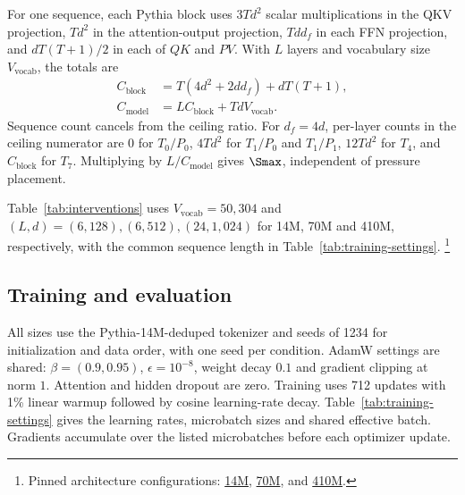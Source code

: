For one sequence, each Pythia block uses $3Td^2$ scalar multiplications
in the QKV projection, $Td^2$ in the attention-output projection,
$Td d_f$ in each FFN projection, and $dT(T+1)/2$ in each of $QK$ and $PV$.
With $L$ layers and vocabulary size $V_{\mathrm{vocab}}$, the totals are
\begin{equation}
\begin{split}
C_{\mathrm{block}}&=T(4d^2+2dd_f)+dT(T+1),\\
C_{\mathrm{model}}&=LC_{\mathrm{block}}+TdV_{\mathrm{vocab}}.
\end{split}
\label{eq:denominator}
\end{equation}
Sequence count cancels from the ceiling ratio. For $d_f=4d$, per-layer counts
in the ceiling numerator are $0$ for $T_0/P_0$, $4Td^2$ for $T_1/P_0$ and
$T_1/P_1$, $12Td^2$ for $T_4$, and $C_{\mathrm{block}}$ for $T_7$.
Multiplying by $L/C_{\mathrm{model}}$ gives $\Smax$, independent of pressure placement.

Table~\ref{tab:interventions} uses $V_{\mathrm{vocab}}=50{,}304$ and
$(L,d)=(6,128),(6,512),(24,1{,}024)$ for 14M, 70M and 410M, respectively,
with the common sequence length in Table~\ref{tab:training-settings}.%
\footnote{Pinned architecture configurations:
\href{https://huggingface.co/EleutherAI/pythia-14m-deduped/blob/7386d9a4ae45aef494a6e704910394def3037fc5/config.json}{14M},
\href{https://huggingface.co/EleutherAI/pythia-70m-deduped/blob/e93a9faa9c77e5d09219f6c868bfc7a1bd65593c/config.json}{70M}, and
\href{https://huggingface.co/EleutherAI/pythia-410m-deduped/blob/b5e8535141902c0e985cea61fd02afe7fe86af32/config.json}{410M}.}

\subsection{Training and evaluation}
\label{app:training-protocol}
\label{app:evaluation}

All sizes use the Pythia-14M-deduped tokenizer and seeds of 1234 for
initialization and data order, with one seed per condition. AdamW settings
are shared: $\beta=(0.9,0.95)$, $\epsilon=10^{-8}$, weight decay $0.1$
and gradient clipping at norm $1$. Attention and hidden dropout are zero.
Training uses 712 updates with 1\% linear warmup followed by cosine
learning-rate decay. Table~\ref{tab:training-settings} gives the learning rates,
microbatch sizes and shared effective batch. Gradients accumulate over the
listed microbatches before each optimizer update.

